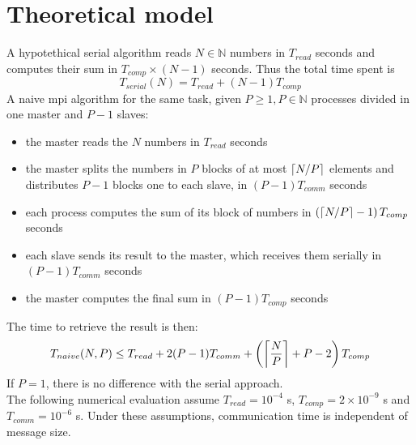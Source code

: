 \documentclass[a4paper, 11pt]{article}
\DeclarePairedDelimiter{\ceil}{\lceil}{\rceil}
\begin{document}
\section{Theoretical model}
A hypotethical serial algorithm reads $N \in \mathbb{N}$ numbers in $T_{read}$ seconds and computes their sum in $T_{comp} \times (N-1)$ seconds. Thus the total time spent is
$$T_{serial}(N) = T_{read} + (N-1)T_{comp}$$
A naive mpi algorithm for the same task, given $P \geq 1, P \in \mathbb{N}$ processes divided in one master and $P-1$ slaves:
\begin{itemize}
\item the master reads the $N$ numbers in $T_{read}$ seconds
\item the master splits the numbers in $P$ blocks of at most $\ceil{N/P}$ elements and distributes $P-1$ blocks one to each slave, in $(P-1)T_{comm}$ seconds
\item each process computes the sum of its block of numbers in $\left(\ceil{N/P}-1\right)T_{comp}$ seconds
\item each slave sends its result to the master, which receives them serially in $(P-1)T_{comm}$ seconds
\item the master computes the final sum in $(P-1)T_{comp}$ seconds
\end{itemize}
The time to retrieve the result is then:
$$T_{naive}(N, P) \leq T_{read} + 2(P-1)T_{comm} + \left(\ceil[\bigg]{\frac{N}{P}}+P-2\right)T_{comp}$$
If $P=1$, there is no difference with the serial approach.\\
The following numerical evaluation assume $T_{read} = 10^{-4}$ s, $T_{comp} = 2 \times 10^{-9}$ s and $T_{comm} = 10^{-6}$ s.
Under these assumptions, communication time is independent of message size.\\
\end{document}
